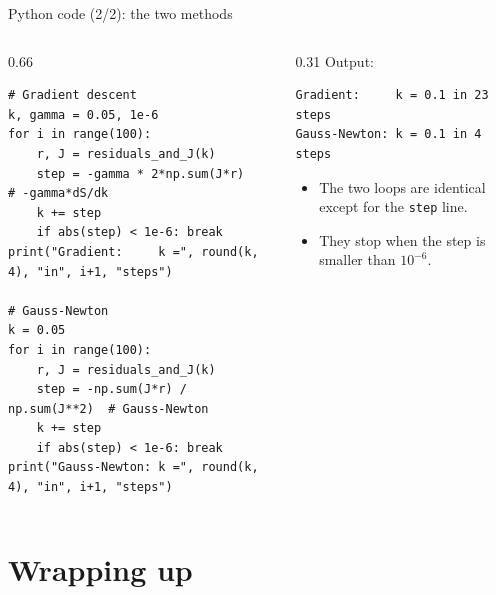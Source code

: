 \documentclass[aspectratio=169,10pt]{beamer}
\begin{document}
\begin{frame}[fragile]{Python code (2/2): the two methods}
\begin{columns}[T]
\begin{column}{0.66\textwidth}
\begin{lstlisting}
# Gradient descent
k, gamma = 0.05, 1e-6
for i in range(100):
    r, J = residuals_and_J(k)
    step = -gamma * 2*np.sum(J*r)       # -gamma*dS/dk
    k += step
    if abs(step) < 1e-6: break
print("Gradient:     k =", round(k, 4), "in", i+1, "steps")

# Gauss-Newton
k = 0.05
for i in range(100):
    r, J = residuals_and_J(k)
    step = -np.sum(J*r) / np.sum(J**2)  # Gauss-Newton
    k += step
    if abs(step) < 1e-6: break
print("Gauss-Newton: k =", round(k, 4), "in", i+1, "steps")
\end{lstlisting}
\end{column}
\begin{column}{0.31\textwidth}
\small
Output:
\begin{lstlisting}[basicstyle=\ttfamily\fontsize{6.5}{8.5}\selectfont\color{texto},xleftmargin=0pt,xrightmargin=0pt,framesep=3pt]
Gradient:     k = 0.1 in 23 steps
Gauss-Newton: k = 0.1 in 4 steps
\end{lstlisting}
\begin{itemize}
  \item The two loops are identical except for the \texttt{step} line.
  \item They stop when the step is smaller than $10^{-6}$.
\end{itemize}
\end{column}
\end{columns}
\end{frame}

\section{Wrapping up}
\end{document}
